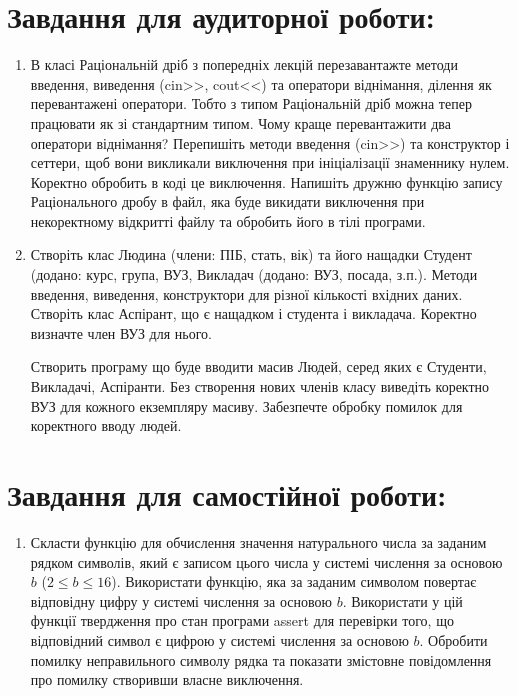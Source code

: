 \documentclass[a5paper,titlepage,openany,twoside,
]
{book_unv}%
\begin{document}
\begin{enumerate}
\begin{enumerate}
\section{Завдання для аудиторної роботи:}

\begin{enumerate}
\def\labelenumi{\arabic{enumi})}

\item
  В класі Раціональній дріб з попередніх лекцій перезавантажте методи
  введення, виведення (cin\textgreater{}\textgreater{},
  cout\textless{}\textless{}) та оператори віднімання, ділення як
  перевантажені оператори. Тобто з типом Раціональній дріб можна тепер
  працювати як зі стандартним типом. Чому краще перевантажити два
  оператори віднімання? Перепишіть методи введення
  (cin\textgreater{}\textgreater{}) та конструктор і сеттери, щоб вони
  викликали виключення при ініціалізації знаменнику нулем. Коректно
  обробить в коді це виключення. Напишіть дружню функцію запису
  Раціонального дробу в файл, яка буде викидати виключення при
  некоректному відкритті файлу та обробить його в тілі програми.

\item
  Створіть клас Людина (члени: ПІБ, стать, вік) та його нащадки
  Студент (додано: курс, група, ВУЗ, Викладач (додано: ВУЗ, посада,
  з.п.). Методи введення, виведення, конструктори для різної кількості
  вхідних даних. Створіть клас Аспірант, що є нащадком і студента і викладача.
 Коректно визначте член ВУЗ для нього. 

 Створить програму що буде вводити масив Людей, серед яких є Студенти,
Викладачі, Аспіранти. Без створення нових членів класу виведіть коректно
ВУЗ для кожного екземпляру масиву. Забезпечте обробку помилок для коректного вводу людей.
\end{enumerate}

\section{Завдання для самостійної роботи:}
\begin{enumerate}
\def\labelenumi{\arabic{enumi})}
\setcounter{enumi}{2}
\item
Скласти функцію для обчислення значення натурального
числа за заданим рядком символів, який є записом цього числа у системі
числення за основою $b$ (\(2 \leq b \leq 16\)). Використати функцію, яка
за заданим символом повертає відповідну цифру у системі числення за
основою $b$. Використати у цій функції твердження про стан програми assert
для перевірки того, що відповідний символ є цифрою у системі числення за
основою $b$. Обробити помилку неправильного символу рядка та
показати змістовне повідомлення про помилку створивши власне виключення.


\end{enumerate}
\end{enumerate}
\end{enumerate}
\end{document}
